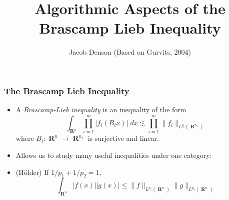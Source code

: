 \documentclass[usenames,dvipsnames,12pt]{beamer}
\title{Algorithmic Aspects of the Brascamp Lieb Inequality}
\author{Jacob Denson (Based on Gurvits, 2004)}
\institute{University of Wisconsin Madison}
\DeclareMathOperator{\RR}{\mathbf{R}}
\begin{document}
\maketitle

\begin{frame}

\frametitle{The Brascamp Lieb Inequality}

\begin{itemize}
    \vspace{-2em}

    \item A \emph{Brascamp-Lieb inequality} is an inequality of the form
    \[ \int_{\RR^n} \prod_{i = 1}^m |f_i(B_i x)|\; dx \lesssim \prod_{i = 1}^m \| f_i \|_{L^{q_i}(\RR^{n_i})} \]
    where $B_i: \RR^n \to \RR^{n_i}$ is surjective and linear.

    \pause
    \item Allows us to study many useful inequalities under one category:

    \pause
    \item (H\"{o}lder) If $1/p_1 + 1/p_2 = 1$,
    \[ \int_{\RR^n} |f(x)| |g(x)| \leq \| f \|_{L^{p_1}(\RR^n)} \| g \|_{L^{p_2}(\RR^n)} \]


\end{itemize}

\end{frame}
\end{document}
